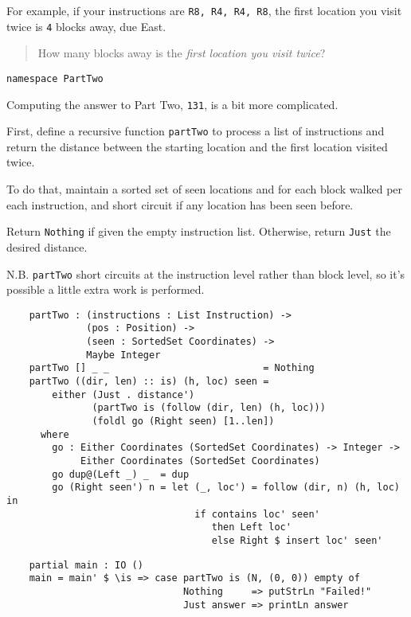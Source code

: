\documentclass[b5paper,twoside]{amsbook}
\begin{document}
For example, if your instructions are
\texttt{R8, R4, R4, R8}, the first location you visit twice
is \texttt{4} blocks away, due East.

\begin{quote}
  How many blocks away is the \textit{first location you visit twice}?
\end{quote}

\begin{verbatim}
namespace PartTwo
\end{verbatim}

Computing the answer to Part Two, \texttt{131}, is a bit
more complicated.

First, define a recursive function \texttt{partTwo} to
process a list of instructions and return the distance between the
starting location and the first location visited twice.

To do that, maintain a sorted set of seen locations and for each block
walked per each instruction, and short circuit if any location has been
seen before.

Return \texttt{Nothing} if given the empty instruction
list. Otherwise, return \texttt{Just} the desired distance.

N.B. \texttt{partTwo} short circuits at the instruction
level rather than block level, so it's possible a little extra work is
performed.

\begin{verbatim}
    partTwo : (instructions : List Instruction) ->
              (pos : Position) ->
              (seen : SortedSet Coordinates) ->
              Maybe Integer
    partTwo [] _ _                           = Nothing
    partTwo ((dir, len) :: is) (h, loc) seen =
        either (Just . distance')
               (partTwo is (follow (dir, len) (h, loc)))
               (foldl go (Right seen) [1..len])
      where
        go : Either Coordinates (SortedSet Coordinates) -> Integer ->
             Either Coordinates (SortedSet Coordinates)
        go dup@(Left _) _  = dup
        go (Right seen') n = let (_, loc') = follow (dir, n) (h, loc) in
                                 if contains loc' seen'
                                    then Left loc'
                                    else Right $ insert loc' seen'
\end{verbatim}

\begin{verbatim}
    partial main : IO ()
    main = main' $ \is => case partTwo is (N, (0, 0)) empty of
                               Nothing     => putStrLn "Failed!"
                               Just answer => printLn answer
\end{verbatim}
\end{document}
